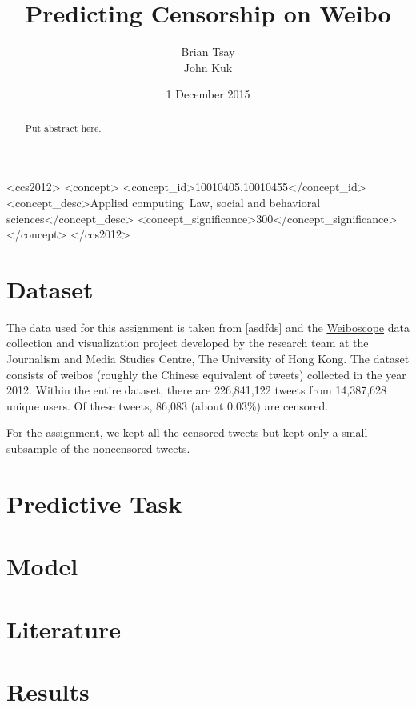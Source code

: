 \documentclass{sig-alternate-05-2015}
\begin{document}
\title{Predicting Censorship on Weibo}

\author{
  \alignauthor
  Brian Tsay \\
  \alignauthor
  John Kuk \\
}

\date{1 December 2015}

\maketitle

\begin{abstract}
  Put abstract here.
\end{abstract}


 \begin{CCSXML}
<ccs2012>
<concept>
<concept_id>10010405.10010455</concept_id>
<concept_desc>Applied computing~Law, social and behavioral sciences</concept_desc>
<concept_significance>300</concept_significance>
</concept>
</ccs2012>
\end{CCSXML}

\printccsdesc

\section{Dataset}
The data used for this assignment is taken from [asdfds] and the \href{http://weiboscope.jmsc.hku.hk/datazip/}{Weiboscope} data collection and visualization project developed by the research team at the Journalism and Media Studies Centre, The University of Hong Kong. The dataset consists of weibos (roughly the Chinese equivalent of tweets) collected in the year 2012. Within the entire dataset, there are 226,841,122 tweets from 14,387,628 unique users. Of these tweets, 86,083 (about 0.03\%) are censored. %

For the assignment, we kept all the censored tweets but kept only a small subsample of the noncensored tweets. 
\section{Predictive Task}

\section{Model}

\section{Literature}

\section{Results}
\end{document}
